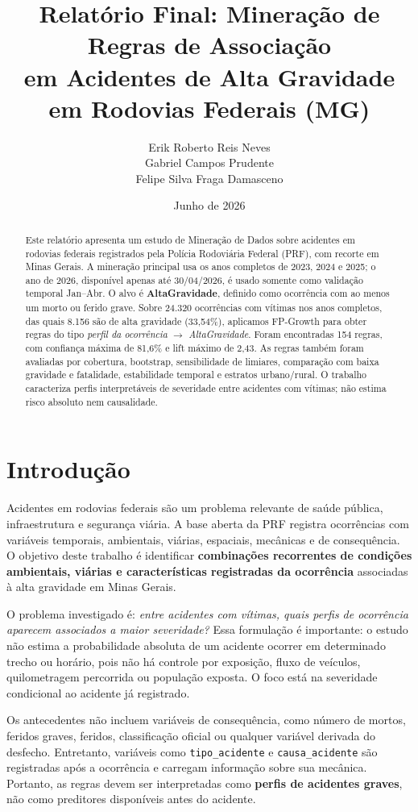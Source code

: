 \documentclass[12pt]{article}
\title{Relatório Final: Mineração de Regras de Associação\\
em Acidentes de Alta Gravidade em Rodovias Federais (MG)}
\author{Erik Roberto Reis Neves \\ Gabriel Campos Prudente \\ Felipe Silva Fraga Damasceno}
\date{Junho de 2026}
\begin{document}
\maketitle

\begin{abstract}
Este relatório apresenta um estudo de Mineração de Dados sobre acidentes em rodovias federais registrados pela Polícia Rodoviária Federal (PRF), com recorte em Minas Gerais. A mineração principal usa os anos completos de 2023, 2024 e 2025; o ano de 2026, disponível apenas até 30/04/2026, é usado somente como validação temporal Jan--Abr. O alvo é \textbf{AltaGravidade}, definido como ocorrência com ao menos um morto ou ferido grave. Sobre 24.320 ocorrências com vítimas nos anos completos, das quais 8.156 são de alta gravidade (33,54\%), aplicamos FP-Growth para obter regras do tipo \textit{perfil da ocorrência} $\rightarrow$ \textit{AltaGravidade}. Foram encontradas 154 regras, com confiança máxima de 81,6\% e lift máximo de 2,43. As regras também foram avaliadas por cobertura, bootstrap, sensibilidade de limiares, comparação com baixa gravidade e fatalidade, estabilidade temporal e estratos urbano/rural. O trabalho caracteriza perfis interpretáveis de severidade entre acidentes com vítimas; não estima risco absoluto nem causalidade.
\end{abstract}

\section{Introdução}

Acidentes em rodovias federais são um problema relevante de saúde pública, infraestrutura e segurança viária. A base aberta da PRF registra ocorrências com variáveis temporais, ambientais, viárias, espaciais, mecânicas e de consequência. O objetivo deste trabalho é identificar \textbf{combinações recorrentes de condições ambientais, viárias e características registradas da ocorrência} associadas à alta gravidade em Minas Gerais.

O problema investigado é: \textit{entre acidentes com vítimas, quais perfis de ocorrência aparecem associados a maior severidade?} Essa formulação é importante: o estudo não estima a probabilidade absoluta de um acidente ocorrer em determinado trecho ou horário, pois não há controle por exposição, fluxo de veículos, quilometragem percorrida ou população exposta. O foco está na severidade condicional ao acidente já registrado.

Os antecedentes não incluem variáveis de consequência, como número de mortos, feridos graves, feridos, classificação oficial ou qualquer variável derivada do desfecho. Entretanto, variáveis como \texttt{tipo\_acidente} e \texttt{causa\_acidente} são registradas após a ocorrência e carregam informação sobre sua mecânica. Portanto, as regras devem ser interpretadas como \textbf{perfis de acidentes graves}, não como preditores disponíveis antes do acidente.
\end{document}

